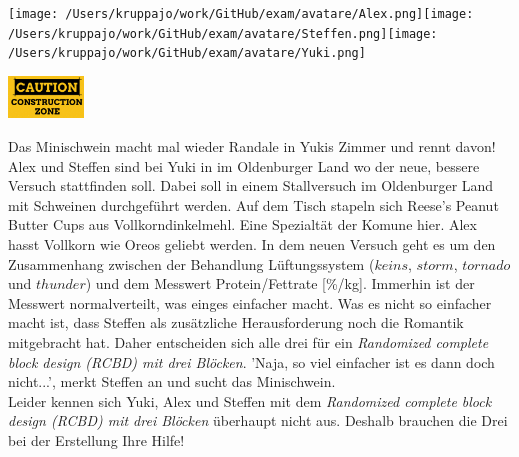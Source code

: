 \documentclass[a4paper, 9pt]{scrartcl}\usepackage[]{graphicx}\usepackage[]{xcolor}
\begin{document}
 
\begin{minipage}[t]{0.5\textwidth}
\texttt{[image: /Users/kruppajo/work/GitHub/exam/avatare/Alex.png]}\hspace{-4mm}\texttt{[image: /Users/kruppajo/work/GitHub/exam/avatare/Steffen.png]}\hspace{-4mm}\texttt{[image: /Users/kruppajo/work/GitHub/exam/avatare/Yuki.png]}
\end{minipage}
\begin{minipage}[t]{0.5\textwidth}
\hfill
\href{https://youtu.be/wJqsNV1hOW8}{\includegraphics[width = 2cm]{img/caution}}
\end{minipage}
\vspace{1ex}



Das Minischwein macht mal wieder Randale in Yukis Zimmer und rennt davon! Alex und Steffen sind bei Yuki in im Oldenburger Land wo der neue, bessere Versuch stattfinden soll. Dabei soll in einem Stallversuch im Oldenburger Land mit Schweinen durchgeführt werden. Auf dem Tisch stapeln sich Reese's Peanut Butter Cups aus Vollkorndinkelmehl. Eine Spezialtät der Komune hier. Alex hasst Vollkorn wie Oreos geliebt werden. In dem neuen Versuch geht es um den Zusammenhang zwischen der Behandlung Lüftungssystem ($keins$, $storm$, $tornado$ und $thunder$) und dem Messwert Protein/Fettrate [\%/kg]. Immerhin ist der Messwert normalverteilt, was einges einfacher macht. Was es nicht so einfacher macht ist, dass Steffen als zusätzliche Herausforderung noch die Romantik mitgebracht hat. Daher entscheiden sich alle drei für ein \textit{Randomized complete block design (RCBD) mit drei Blöcken}. 'Naja, so viel einfacher ist es dann doch nicht...', merkt Steffen an und sucht das Minischwein.\\

Leider kennen sich Yuki, Alex und Steffen mit dem \textit{Randomized complete block design (RCBD) mit drei Blöcken} überhaupt nicht aus. Deshalb brauchen die Drei bei der Erstellung Ihre Hilfe!
\end{document}
